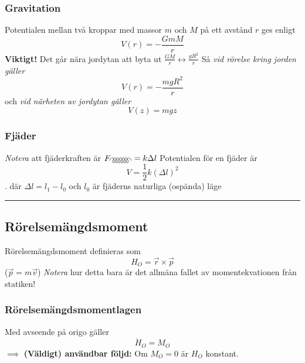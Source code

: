 \documentclass{article}
\newenvironment{ankiflashcard}[1]{}{}
\newcommand{\ruler}{
\rule{0.5\textwidth}{0.5pt}
}
\begin{document}
\begin{paracol}{2}
\begin{ankiflashcard}{Definiera gravitationspotentialen, i alla tre fall.}
\subsubsection{Gravitation}
Potentialen mellan två kroppar med massor $m$ och $M$ på ett avstånd $r$ ges enligt
$$
V(r)=-\frac{GmM}{r}
$$
\textbf{Viktigt!} Det går nära jordytan att byta ut $\frac{GM}{r} \longleftrightarrow \frac{gR^2}{r}$
Så \textit{vid rörelse kring jorden gäller}
$$
V(r)=-\frac{mgR^2}{r}
$$
och \textit{vid närheten av jordytan gäller}
$$
V(z)=mgz
$$
\end{ankiflashcard}

\begin{ankiflashcard}{Definiera potentialenergi och fjäderkraft för en fjäder.}
    \subsubsection{Fjäder}
    \textit{Notera} att fjäderkraften är $F_{\gluon}=k\Delta l$
    Potentialen för en fjäder är
    $$
    V = \frac{1}{2}k(\Delta l)^2
    $$ .
    där $\Delta l=l_1-l_0$ och $l_0$ är fjäderns naturliga (ospända) läge
\end{ankiflashcard}
\ruler

\begin{ankiflashcard}{Definiera rörelsemängdsmoment}
    
\subsection{Rörelsemängdsmoment}
Rörelsemängdsmoment definieras som
$$
H_O = \vec r \times \vec p
$$
($\vec p = m \vec v$)
\textit{Notera} hur detta bara är det allmäna fallet av momentekvationen från statiken!
\end{ankiflashcard}


\begin{ankiflashcard}{Definiera rörelsemängdsmomentlagen.}
\subsubsection{Rörelsemängdsmomentlagen}
Med avseende på origo gäller
$$
\dot H_O = M_O
$$
$\implies$ \textbf{(Väldigt) användbar följd:} Om $M_O=0$ är $H_O$ konstant.
\end{ankiflashcard}



\end{paracol}
\end{document}
